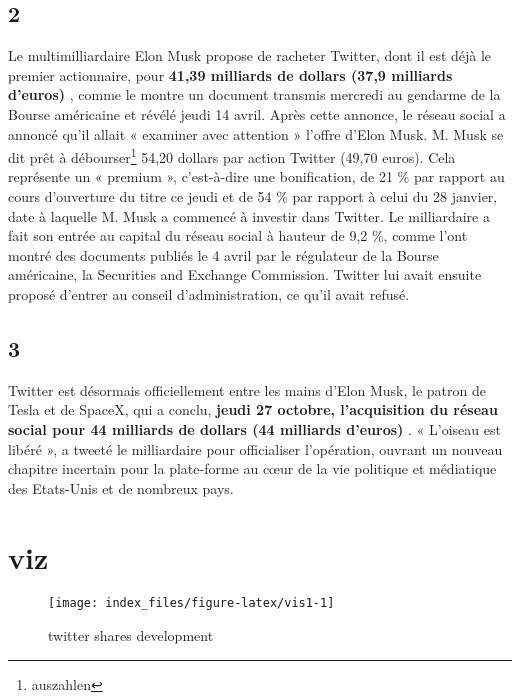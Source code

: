 \documentclass[]{tufte-handout}
\begin{document}
\subsection{2}\label{section-1}

Le multimilliardaire Elon Musk propose de racheter Twitter, dont il est
déjà le premier actionnaire, pour \textbf{41,39 milliards de dollars
(37,9 milliards d'euros) }, comme le montre un document transmis
mercredi au gendarme de la Bourse américaine et révélé jeudi 14 avril.
Après cette annonce, le réseau social a annoncé qu'il allait « examiner
avec attention » l'offre d'Elon Musk. M. Musk se dit prêt à
débourser\footnote{auszahlen} 54,20 dollars par action Twitter (49,70
euros). Cela représente un « premium », c'est-à-dire une bonification,
de 21 \% par rapport au cours d'ouverture du titre ce jeudi et de 54 \%
par rapport à celui du 28 janvier, date à laquelle M. Musk a commencé à
investir dans Twitter. Le milliardaire a fait son entrée au capital du
réseau social à hauteur de 9,2 \%, comme l'ont montré des documents
publiés le 4 avril par le régulateur de la Bourse américaine, la
Securities and Exchange Commission. Twitter lui avait ensuite proposé
d'entrer au conseil d'administration, ce qu'il avait refusé.
\citep[Q:][]{le_monde_elon_2022-1}

\subsection{3}\label{section-2}

Twitter est désormais officiellement entre les mains d'Elon Musk, le
patron de Tesla et de SpaceX, qui a conclu, \textbf{jeudi 27 octobre,
l'acquisition du réseau social pour 44 milliards de dollars (44
milliards d'euros) }. « L'oiseau est libéré », a tweeté le milliardaire
pour officialiser l'opération, ouvrant un nouveau chapitre incertain
pour la plate-forme au cœur de la vie politique et médiatique des
Etats-Unis et de nombreux pays. \citep[Q:][]{le_monde_elon_2022-2}

\section{viz}\label{viz}

\begin{figure}
\texttt{[image: index\_files/figure-latex/vis1-1]} \caption[twitter shares development]{twitter shares development}\label{fig:vis1}
\end{figure}

\citep[Q:][]{digrin_twitter_2025}
\end{document}
